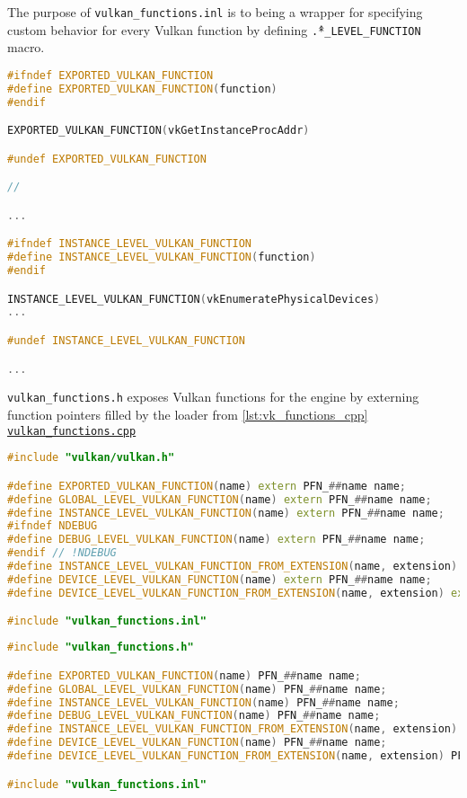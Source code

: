 The purpose of \texttt{vulkan\_functions.inl} is to being a wrapper for specifying custom behavior for every Vulkan function by defining \texttt{\^.*\_LEVEL\_FUNCTION} macro.
\label{lst:vk_functions_inl}
\begin{lstlisting}[language=c++, caption=(./engine/src/vulkan\_tools/vulkan\_functions.inl]
#ifndef EXPORTED_VULKAN_FUNCTION
#define EXPORTED_VULKAN_FUNCTION(function)
#endif

EXPORTED_VULKAN_FUNCTION(vkGetInstanceProcAddr)

#undef EXPORTED_VULKAN_FUNCTION

//

...

#ifndef INSTANCE_LEVEL_VULKAN_FUNCTION
#define INSTANCE_LEVEL_VULKAN_FUNCTION(function)
#endif

INSTANCE_LEVEL_VULKAN_FUNCTION(vkEnumeratePhysicalDevices)
...

#undef INSTANCE_LEVEL_VULKAN_FUNCTION

...
\end{lstlisting}

\texttt{vulkan\_functions.h} exposes Vulkan functions for the engine by externing function pointers filled by the loader from \hyperref[lst:vk_functions_cpp]{\ref*{lst:vk_functions_cpp} \texttt{vulkan\_functions.cpp}}
\begin{lstlisting}[language=c++, caption=(./engine/src/vulkan\_tools/vulkan\_functions.h]
#include "vulkan/vulkan.h"

#define EXPORTED_VULKAN_FUNCTION(name) extern PFN_##name name;
#define GLOBAL_LEVEL_VULKAN_FUNCTION(name) extern PFN_##name name;
#define INSTANCE_LEVEL_VULKAN_FUNCTION(name) extern PFN_##name name;
#ifndef NDEBUG
#define DEBUG_LEVEL_VULKAN_FUNCTION(name) extern PFN_##name name;
#endif // !NDEBUG
#define INSTANCE_LEVEL_VULKAN_FUNCTION_FROM_EXTENSION(name, extension) extern PFN_##name name;
#define DEVICE_LEVEL_VULKAN_FUNCTION(name) extern PFN_##name name;
#define DEVICE_LEVEL_VULKAN_FUNCTION_FROM_EXTENSION(name, extension) extern PFN_##name name;

#include "vulkan_functions.inl"
\end{lstlisting}

\label{lst:vk_functions_cpp}
\begin{lstlisting}[language=c++, caption=(./engine/src/vulkan\_tools/vulkan\_functions.cpp)]
#include "vulkan_functions.h"

#define EXPORTED_VULKAN_FUNCTION(name) PFN_##name name;
#define GLOBAL_LEVEL_VULKAN_FUNCTION(name) PFN_##name name;
#define INSTANCE_LEVEL_VULKAN_FUNCTION(name) PFN_##name name;
#define DEBUG_LEVEL_VULKAN_FUNCTION(name) PFN_##name name;
#define INSTANCE_LEVEL_VULKAN_FUNCTION_FROM_EXTENSION(name, extension) PFN_##name name;
#define DEVICE_LEVEL_VULKAN_FUNCTION(name) PFN_##name name;
#define DEVICE_LEVEL_VULKAN_FUNCTION_FROM_EXTENSION(name, extension) PFN_##name name;

#include "vulkan_functions.inl"
\end{lstlisting}